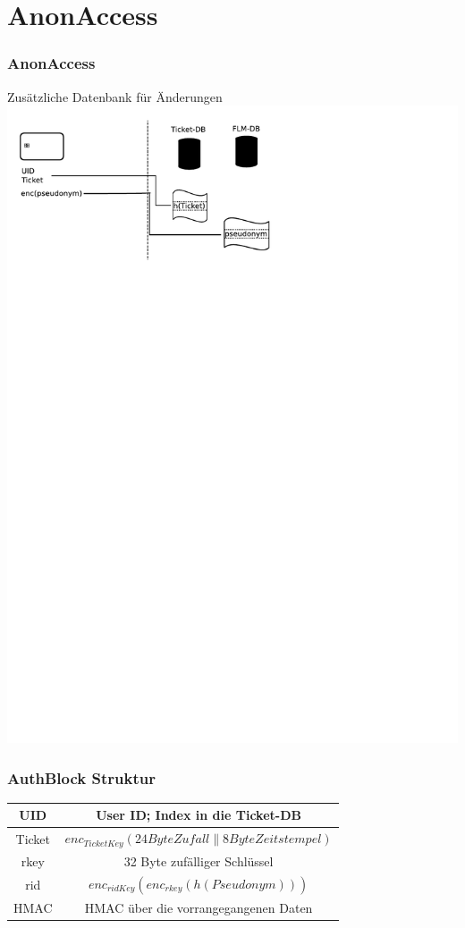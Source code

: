 \section{AnonAccess}


\begin{frame}
	\frametitle{AnonAccess}
	Zusätzliche Datenbank für Änderungen
	\includegraphics[scale=0.75]{ansatz3.pdf}
\end{frame}



\begin{frame}
	\frametitle{AuthBlock Struktur}
\begin{tabular}{|c|c|}
\hline UID & User ID; Index in die Ticket-DB \\ 
\hline Ticket   & $enc_{TicketKey}(24 Byte Zufall \parallel 8 Byte Zeitstempel)$ \\ 
\hline rkey     & 32 Byte zufälliger Schlüssel \\ 
\hline rid      & $enc_{ridKey}\left(enc_{rkey}\left(h\left(Pseudonym\right)\right)\right)$ \\ 
\hline HMAC     & HMAC über die vorrangegangenen Daten \\ 
\hline 
\end{tabular} 
\end{frame}

